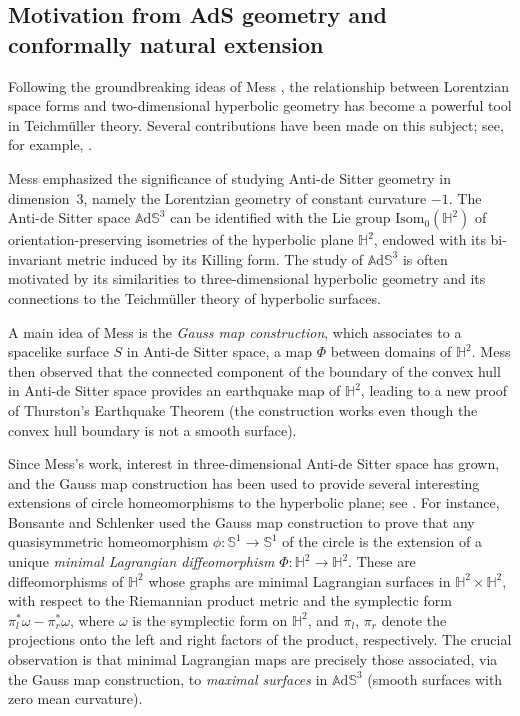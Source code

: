 \documentclass[10pt]{amsart}
\theoremstyle{plain}
\theoremstyle{definition}
\newcommand{\ads}{\mathbb{A}\mathrm{d}\mathbb{S}^3}
\let\Subsection\subsection\let\Subsubsection\subsubsection
\begin{document}
\Subsection{Motivation from AdS geometry and conformally natural extension}
Following the groundbreaking ideas of Mess \cite{Mess}, the relationship between Lorentzian space forms and two-dimensional hyperbolic geometry has become a powerful tool in Teichmüller theory. Several contributions have been made on this subject; see, for example, \cite{Note_on_paper_mess,flatspacetimes_bonsante,Barbot_flatspacetime,canorot,BS_flat_conical}.

Mess emphasized the significance of studying Anti-de Sitter geometry in dimension~$3$, namely the Lorentzian geometry of constant curvature $-1$. The Anti-de Sitter space $\ads$ can be identified with the Lie group \(\text{Isom}_0(\mathbb{H}^2)\) of orientation-preserving isometries of the hyperbolic plane \(\mathbb{H}^2\), endowed with its bi-invariant metric induced by its Killing form. The study of $\ads$ is often motivated by its similarities to three-dimensional hyperbolic geometry and its connections to the Teichmüller theory of hyperbolic surfaces.

A main idea of Mess is the \emph{Gauss map construction}, which associates to a spacelike surface \(S\) in Anti-de Sitter space, a map \(\Phi\) between domains of \(\mathbb{H}^2\). Mess then observed that the connected component of the boundary of the convex hull in Anti-de Sitter space provides an earthquake map of \(\mathbb{H}^2\), leading to a new proof of Thurston's Earthquake Theorem \cite{Thurston} (the construction works even though the convex hull boundary is not a smooth surface).

Since Mess's work, interest in three-dimensional Anti-de Sitter space has grown, and the Gauss map construction has been used to provide several interesting extensions of circle homeomorphisms to the hyperbolic plane; see \cite{Maximalsurface, Areapreserving, SEP19}. For instance, Bonsante and Schlenker used the Gauss map construction to prove that any quasisymmetric homeomorphism \(\phi:\mathbb{S}^1 \to \mathbb{S}^1\) of the circle is the extension of a unique \emph{minimal Lagrangian diffeomorphism} \(\Phi:\mathbb{H}^2 \to \mathbb{H}^2\). These are diffeomorphisms of \(\mathbb{H}^2\) whose graphs are minimal Lagrangian surfaces in \(\mathbb{H}^2 \times \mathbb{H}^2\), with respect to the Riemannian product metric and the symplectic form \(\pi_l^* \omega - \pi_r^* \omega\), where \(\omega\) is the symplectic form on \(\mathbb{H}^2\), and \(\pi_l\), \(\pi_r\) denote the projections onto the left and right factors of the product, respectively.
The crucial observation is that minimal Lagrangian maps are precisely those associated, via the Gauss map construction, to \emph{maximal surfaces} in $\ads$ (\ie smooth surfaces with zero mean curvature).
\end{document}
